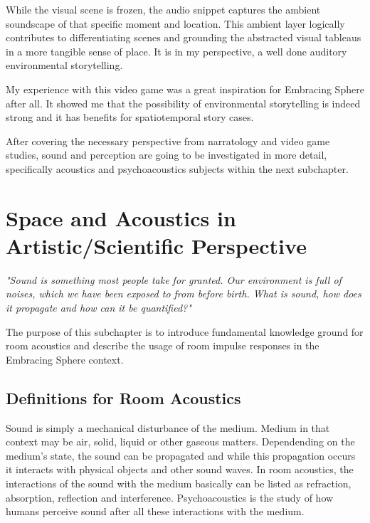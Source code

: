             While the visual scene is frozen, the audio snippet captures the ambient soundscape of that specific moment and location. This ambient layer logically contributes to differentiating scenes and grounding the abstracted visual tableaus in a more tangible sense of place. It is in my perspective, a well done auditory environmental storytelling.\par           

            My experience with this video game was a great inspiration for Embracing Sphere after all. It showed me that the possibility of environmental storytelling is indeed strong and it has benefits for spatiotemporal story cases.\par

            After covering the necessary perspective from narratology and video game studies, sound and perception are going to be investigated in more detail, specifically acoustics and psychoacoustics subjects within the next subchapter.
    \section{Space and Acoustics in Artistic/Scientific Perspective}
            \emph{"Sound is something most people take for granted. Our environment is full of noises, which we have been exposed to from before birth. What is sound, how does it propagate and how can it be quantified?"\cite{Acoustics_and_Psychophysics}}\par 

            The purpose of this subchapter is to introduce fundamental knowledge ground for room acoustics and describe the usage of room impulse responses in the Embracing Sphere context.\par
        \subsection{Definitions for Room Acoustics}
            Sound is simply a mechanical disturbance of the medium. Medium in that context may be air, solid, liquid or other gaseous matters. Dependending on the medium's state, the sound can be propagated and while this propagation occurs it interacts with physical objects and other sound waves. In room acoustics, the interactions of the sound with the medium basically can be listed as refraction, absorption, reflection and interference. Psychoacoustics is the study of how humans perceive sound after all these interactions with the medium\cite{Acoustics_and_Psychophysics}.\par

